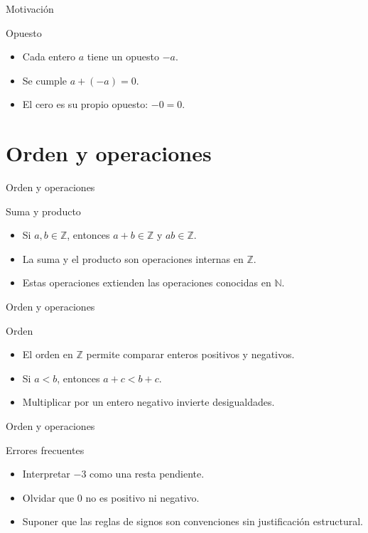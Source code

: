 \documentclass[aspectratio=169,11pt]{beamer}
\begin{document}
\begin{frame}{Motivación}
\begin{block}{Opuesto}
\begin{itemize}
  \item Cada entero \(a\) tiene un opuesto \(-a\).
  \item Se cumple \(a+(-a)=0\).
  \item El cero es su propio opuesto: \(-0=0\).
\end{itemize}
\end{block}
\end{frame}

\section{Orden y operaciones}

\begin{frame}{Orden y operaciones}
\begin{block}{Suma y producto}
\begin{itemize}
  \item Si \(a,b\in\mathbb{Z}\), entonces \(a+b\in\mathbb{Z}\) y \(ab\in\mathbb{Z}\).
  \item La suma y el producto son operaciones internas en \(\mathbb{Z}\).
  \item Estas operaciones extienden las operaciones conocidas en \(\mathbb{N}\).
\end{itemize}
\end{block}
\end{frame}

\begin{frame}{Orden y operaciones}
\begin{block}{Orden}
\begin{itemize}
  \item El orden en \(\mathbb{Z}\) permite comparar enteros positivos y negativos.
  \item Si \(a<b\), entonces \(a+c<b+c\).
  \item Multiplicar por un entero negativo invierte desigualdades.
\end{itemize}
\end{block}
\end{frame}

\begin{frame}{Orden y operaciones}
\begin{block}{Errores frecuentes}
\begin{itemize}
  \item Interpretar \(-3\) como una resta pendiente.
  \item Olvidar que \(0\) no es positivo ni negativo.
  \item Suponer que las reglas de signos son convenciones sin justificación estructural.
\end{itemize}
\end{block}
\end{frame}
\end{document}
